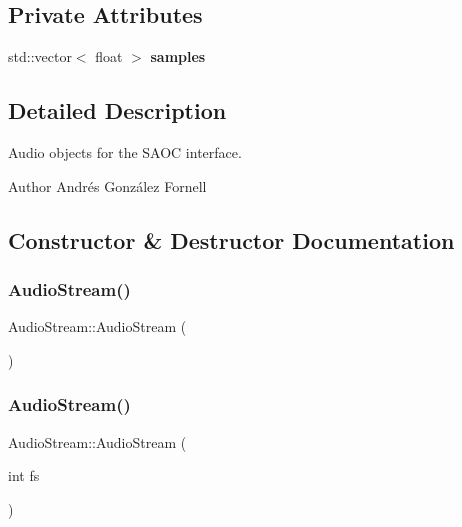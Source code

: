 \subsection*{Private Attributes}
\begin{DoxyCompactItemize}
\item 
std\+::vector$<$ float $>$ \textbf{ samples}
\end{DoxyCompactItemize}


\subsection{Detailed Description}
Audio objects for the S\+A\+OC interface. 

\begin{DoxyAuthor}{Author}
Andrés González Fornell 
\end{DoxyAuthor}


\subsection{Constructor \& Destructor Documentation}
\mbox{\label{class_audio_stream_ab2e106f7e2f70f0cfb1d7b171da71f16}} 
\subsubsection{Audio\+Stream()\hspace{0.1cm}{\footnotesize\ttfamily [1/2]}}
{\footnotesize\ttfamily Audio\+Stream\+::\+Audio\+Stream (\begin{DoxyParamCaption}{ }\end{DoxyParamCaption})}

\mbox{\label{class_audio_stream_aea68e011ea0d4cf15a527492155a77c1}} 
\subsubsection{Audio\+Stream()\hspace{0.1cm}{\footnotesize\ttfamily [2/2]}}
{\footnotesize\ttfamily Audio\+Stream\+::\+Audio\+Stream (\begin{DoxyParamCaption}\item[{int}]{fs }\end{DoxyParamCaption})}

